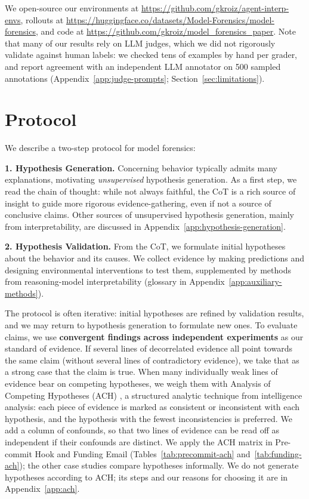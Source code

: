 \documentclass{article}
\begin{document}
We open-source our environments at \url{https://github.com/gkroiz/agent-interp-envs}, rollouts at \url{https://huggingface.co/datasets/Model-Forensics/model-forensics}, and code at \url{https://github.com/gkroiz/model_forensics_paper}. Note that many of our results rely on LLM judges, which we did not rigorously validate against human labels: we checked tens of examples by hand per grader, and report agreement with an independent LLM annotator on 500 sampled annotations (Appendix~\ref{app:judge-prompts}; Section~\ref{sec:limitations}).

\section{Protocol}
\label{sec:protocol}
We describe a two-step protocol for model forensics:

\textbf{1. Hypothesis Generation.} Concerning behavior typically admits many explanations, motivating \textit{unsupervised} hypothesis generation. As a first step, we read the chain of thought: while not always faithful, the CoT is a rich source of insight to guide more rigorous evidence-gathering, even if not a source of conclusive claims. Other sources of unsupervised hypothesis generation, mainly from interpretability, are discussed in Appendix~\ref{app:hypothesis-generation}.

\textbf{2. Hypothesis Validation.} From the CoT, we formulate initial hypotheses about the behavior and its causes. We collect evidence by making predictions and designing environmental interventions to test them, supplemented by methods from reasoning-model interpretability (glossary in Appendix~\ref{app:auxiliary-methods}).

The protocol is often iterative: initial hypotheses are refined by validation results, and we may return to hypothesis generation to formulate new ones. To evaluate claims, we use \textbf{convergent findings across independent experiments} as our standard of evidence. If several lines of decorrelated evidence all point towards the same claim (without several lines of contradictory evidence), we take that as a strong case that the claim is true. When many individually weak lines of evidence bear on competing hypotheses, we weigh them with Analysis of Competing Hypotheses (ACH) \citep{heuer1999psychology}, a structured analytic technique from intelligence analysis: each piece of evidence is marked as consistent or inconsistent with each hypothesis, and the hypothesis with the fewest inconsistencies is preferred. We add a column of confounds, so that two lines of evidence can be read off as independent if their confounds are distinct. We apply the ACH matrix in Pre-commit Hook and Funding Email (Tables~\ref{tab:precommit-ach} and~\ref{tab:funding-ach}); the other case studies compare hypotheses informally. We do not generate hypotheses according to ACH; its steps and our reasons for choosing it are in Appendix~\ref{app:ach}.
\end{document}
